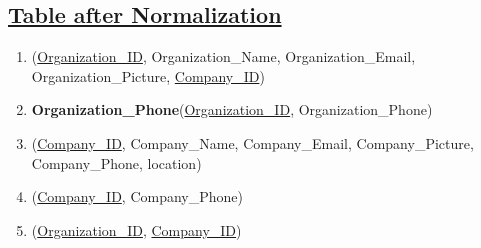 \subsection*{\underline{Table after Normalization}}
\begin{enumerate}
    \item (\underline{Organization\_ID}, Organization\_Name, Organization\_Email, Organization\_Picture, \underline{Company\_ID})
    \item \textbf{Organization\_Phone}(\underline{Organization\_ID}, Organization\_Phone)
    \item (\underline{Company\_ID}, Company\_Name, Company\_Email, Company\_Picture, Company\_Phone, location)
    \item (\underline{Company\_ID}, Company\_Phone)
    \item (\underline{Organization\_ID}, \underline{Company\_ID})
\end{enumerate}



\clearpage
